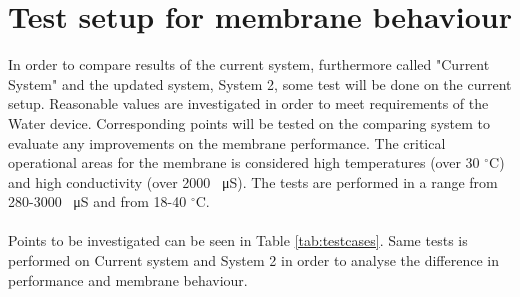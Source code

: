 \section{Test setup for membrane behaviour}
In order to compare results of the current system, furthermore called "Current System" and the updated system, System 2, some test will be done on the current setup. Reasonable values are investigated in order to meet requirements of the Water device. Corresponding points will be tested on the comparing system to evaluate any improvements on the membrane performance. The critical operational areas for the membrane is considered high temperatures (over 30 $^\circ$C) and high conductivity (over 2000 \SI{}{\micro\siemens}). The tests are performed in a range from 280-3000 \SI{}{\micro\siemens} and from 18-40 $^\circ$C. \\
\\
Points to be investigated can be seen in Table \ref{tab:testcases}. Same tests is performed on Current system and System 2 in order to analyse the difference in performance and membrane behaviour.\\
